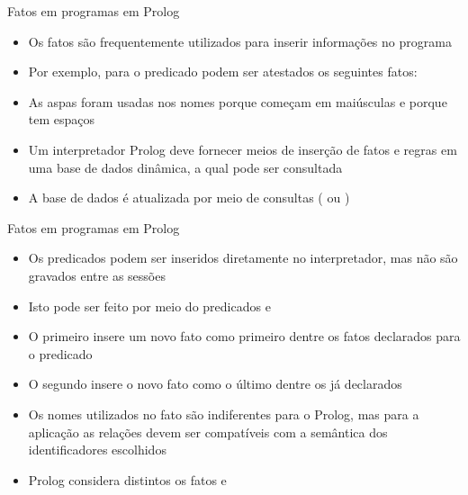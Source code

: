 \begin{frame}[fragile]{Fatos em programas em Prolog}

    \begin{itemize}
        \item Os fatos são frequentemente utilizados para inserir informações no programa

        \item Por exemplo, para o predicado  podem ser atestados os 
            seguintes fatos:


        \item As aspas foram usadas nos nomes porque começam em maiúsculas e porque tem espaços

        \item Um interpretador Prolog deve fornecer meios de inserção de fatos e regras em uma 
            base de dados dinâmica, a qual pode ser consultada

        \item A base de dados é atualizada por meio de consultas ( ou
            )

    \end{itemize}

\end{frame}

\begin{frame}[fragile]{Fatos em programas em Prolog}

    \begin{itemize}
        \item Os predicados podem ser inseridos diretamente no interpretador, mas não são
            gravados entre as sessões

        \item Isto pode ser feito por meio do predicados  e

        \item O primeiro insere um novo fato como primeiro dentre os fatos declarados para
            o predicado

        \item O segundo insere o novo fato como o último dentre os já declarados

        \item Os nomes utilizados no fato são indiferentes para o Prolog, mas para a aplicação 
            as relações devem ser compatíveis com a semântica dos identificadores escolhidos

        \item Prolog considera distintos os fatos  e 



    \end{itemize}

\end{frame}
